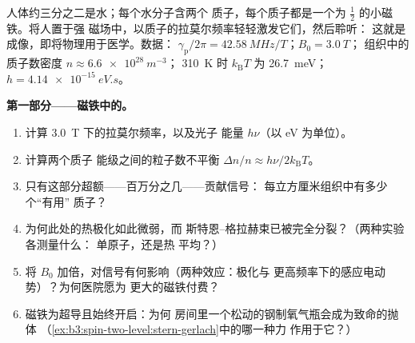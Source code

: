\begin{problem}\label{pb:b3:spin-two-level:1}
人体约三分之二是水；每个水分子含两个
质子，每个质子都是一个为 $\tfrac12$ 的小磁铁。将人置于强
磁场中，以质子的拉莫尔频率轻轻激发它们，然后聆听：
这就是成像，即将物理用于医学。数据：
$\gamma_{\text{p}}/2\pi = \qty{42.58}{MHz/T}$；$B_0 = \qty{3.0}{T}$；
组织中的质子数密度 $n \approx \qty{6.6e28}{m^{-3}}$；
\qty{310}{K} 时 $k_{\text{B}}T$ 为 \qty{26.7}{meV}；$h =
\qty{4.14e-15}{eV.s}$。

\medskip\noindent\textbf{第一部分——磁铁中的。}
\begin{enumerate}
  \item 计算 \qty{3.0}{T} 下的拉莫尔频率，以及光子
        能量 $h\nu$（以 eV 为单位）。
  \item 计算两个质子
        能级之间的粒子数不平衡 $\Delta n/n \approx h\nu/2k_{\text{B}}T$。
  \item 只有这部分超额——百万分之几——贡献信号：
        每立方厘米组织中有多少个“有用”
        质子？
  \item 为何此处的热极化如此微弱，而
        斯特恩–格拉赫束已被完全分裂？（两种实验各测量什么：
        单原子，还是热
        平均？）
  \item 将 $B_0$ 加倍，对信号有何影响（两种效应：极化与
        更高频率下的感应电动势）？为何医院愿为
        更大的磁铁付费？
  \item 磁铁为超导且始终开启：为何
        房间里一个松动的钢制氧气瓶会成为致命的抛体
        （\cref{ex:b3:spin-two-level:stern-gerlach}中的哪一种力
        作用于它？）
\end{enumerate}


\end{problem}
